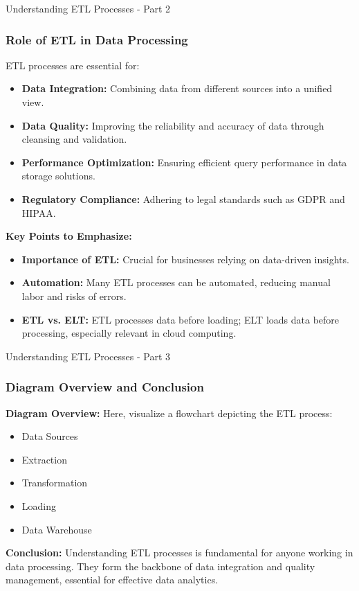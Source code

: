 \documentclass[aspectratio=169]{beamer}
\begin{document}
\begin{frame}[fragile]{Understanding ETL Processes - Part 2}
    \frametitle{Role of ETL in Data Processing}
    ETL processes are essential for:

    \begin{itemize}
        \item \textbf{Data Integration:} Combining data from different sources into a unified view.
        \item \textbf{Data Quality:} Improving the reliability and accuracy of data through cleansing and validation.
        \item \textbf{Performance Optimization:} Ensuring efficient query performance in data storage solutions.
        \item \textbf{Regulatory Compliance:} Adhering to legal standards such as GDPR and HIPAA.
    \end{itemize}
    
    \textbf{Key Points to Emphasize:}
    \begin{itemize}
        \item \textbf{Importance of ETL:} Crucial for businesses relying on data-driven insights.
        \item \textbf{Automation:} Many ETL processes can be automated, reducing manual labor and risks of errors.
        \item \textbf{ETL vs. ELT:} ETL processes data before loading; ELT loads data before processing, especially relevant in cloud computing.
    \end{itemize}
\end{frame}

\begin{frame}[fragile]{Understanding ETL Processes - Part 3}
    \frametitle{Diagram Overview and Conclusion}
    \textbf{Diagram Overview:}
    Here, visualize a flowchart depicting the ETL process:
    
    \begin{itemize}
        \item Data Sources
        \item Extraction
        \item Transformation
        \item Loading
        \item Data Warehouse
    \end{itemize}
    
    \textbf{Conclusion:}
    Understanding ETL processes is fundamental for anyone working in data processing. 
    They form the backbone of data integration and quality management, essential for effective data analytics.
\end{frame}
\end{document}

